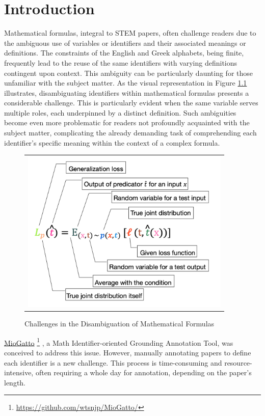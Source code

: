 \chapter{Introduction}\label{chapter:introduction}

Mathematical formulas, integral to \ac{STEM} papers, often challenge readers due to the ambiguous use of variables or identifiers and their associated meanings or definitions. The constraints of the English and Greek alphabets, being finite, frequently lead to the reuse of the same identifiers with varying definitions contingent upon context. This ambiguity can be particularly daunting for those unfamiliar with the subject matter. As the visual representation in Figure \ref{fig:introduction-motivation} illustrates, disambiguating identifiers within mathematical formulas presents a considerable challenge. This is particularly evident when the same variable serves multiple roles, each underpinned by a distinct definition. Such ambiguities become even more problematic for readers not profoundly acquainted with the subject matter, complicating the already demanding task of comprehending each identifier's specific meaning within the context of a complex formula.

\begin{figure}[htpb]
  \centering
  \begin{tabular}{c}
    \includegraphics[width=10cm]{images/introduction-motivation.png}
  \end{tabular}
  \caption[Challenges in Disambiguation]{Challenges in the Disambiguation of Mathematical Formulas}\label{fig:introduction-motivation}
\end{figure}



\href{https://github.com/wtsnjp/MioGatto/tree/main}{MioGatto} \footnote{\url{https://github.com/wtsnjp/MioGatto/}} \citep{asakura2021miogatto}, a Math Identifier-oriented Grounding Annotation Tool, was conceived to address this issue. However, manually annotating papers to define each identifier is a new challenge. This process is time-consuming and resource-intensive, often requiring a whole day for annotation, depending on the paper's length.


